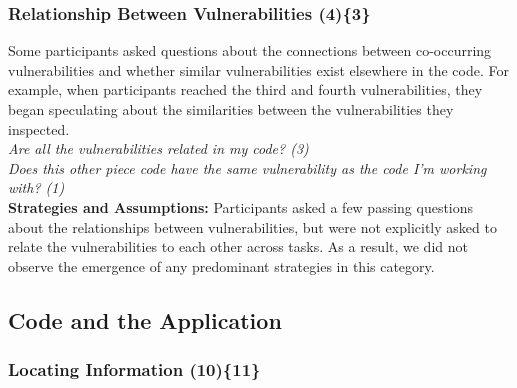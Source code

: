 \documentclass[10pt,journal,compsoc]{IEEEtran}
\begin{document}


\subsubsection{Relationship Between Vulnerabilities (4)\{3\}}\label{rbb}

Some participants asked questions about the connections between co-occurring vulnerabilities and whether similar vulnerabilities exist elsewhere in the code. 
For example, when participants reached the third and fourth vulnerabilities, they began speculating about the similarities between the vulnerabilities they inspected.
\\

\noindent\emph{Are all the vulnerabilities related in my code? (3)} \\
\emph{Does this other piece code have the same vulnerability as the code I'm working with? (1)} 
\\

\textbf{Strategies and Assumptions:}
Participants asked a few passing questions about the relationships between vulnerabilities, but were not explicitly asked to relate the vulnerabilities to each other across tasks. 
As a result, we did not observe the emergence of any predominant strategies in this category.

%


\subsection{Code and the Application}
\label{sec:results-ca}
\subsubsection{Locating Information (10)\{11\}}\label{li}
\end{document}
